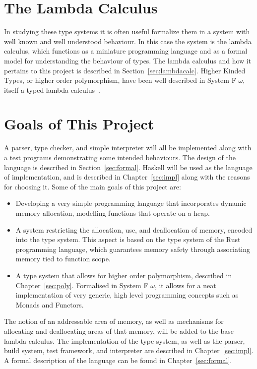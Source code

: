 \section{The Lambda Calculus}
In studying these type systems it is often useful formalize them in a system
with well known and well understood behaviour. In this case the system is the
lambda calculus, which functions as a miniature programming language and as a
formal model for understanding the behaviour of types. The lambda calculus and
how it pertains to this project is described in Section~\ref{sec:lambdacalc}.
Higher Kinded Types, or higher order polymorphism, have been well described in
System F $\omega$, itself a typed lambda calculus~\cite{tapl}.

\section{Goals of This Project}
A parser, type checker, and simple interpreter will all be implemented along
with a test programs demonstrating some intended behaviours. The design of the
language is described in Section~\ref{sec:formal}.  Haskell will be used as the
language of implementation, and is described in Chapter~\ref{sec:impl} along
with the reasons for choosing it. Some of the main goals of this project are:

\begin{itemize}
    \item
        Developing a very simple programming language that incorporates dynamic
        memory allocation, modelling functions that operate on a heap. 
    \item
        A system restricting the allocation, use, and deallocation of memory,
        encoded into the type system. This aspect is based on the type system
        of the Rust programming language, which guarantees memory safety
        through associating memory tied to function scope.
    \item 
        A type system that allows for higher order polymorphism, described in
        Chapter~\ref{sec:poly}.  Formalised in System F $\omega$, it allows
        for a neat implementation of very generic, high level programming
        concepts such as Monads and Functors.
\end{itemize}

The notion of an addressable area of memory, as well as mechanisms for
allocating and deallocating areas of that memory, will be added to the base
lambda calculus.  The implementation of the type system, as well as the parser,
build system, test framework, and interpreter are described in
Chapter~\ref{sec:impl}. A formal description of the language can be found in
Chapter~\ref{sec:formal}.

